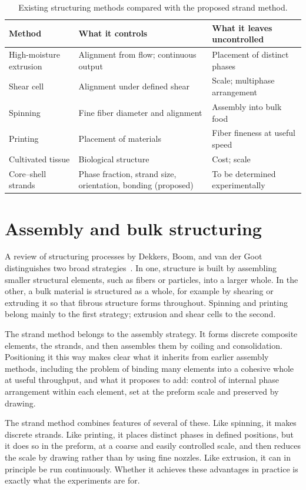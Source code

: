 \documentclass[11pt,openany]{book}
\theoremstyle{definition}
\begin{document}
\begin{table}[h]
\centering
\begin{tabularx}{\linewidth}{@{}lXX@{}}
\toprule
Method & What it controls & What it leaves uncontrolled \\
\midrule
High-moisture extrusion & Alignment from flow; continuous output & Placement of distinct phases \\
Shear cell & Alignment under defined shear & Scale; multiphase arrangement \\
Spinning & Fine fiber diameter and alignment & Assembly into bulk food \\
Printing & Placement of materials & Fiber fineness at useful speed \\
Cultivated tissue & Biological structure & Cost; scale \\
Core--shell strands & Phase fraction, strand size, orientation, bonding (proposed) & To be determined experimentally \\
\bottomrule
\end{tabularx}
\caption{Existing structuring methods compared with the proposed strand method.}
\end{table}

\section{Assembly and bulk structuring}

A review of structuring processes by Dekkers, Boom, and van der Goot distinguishes two broad strategies~\cite{dekkers2018}. In one, structure is built by assembling smaller structural elements, such as fibers or particles, into a larger whole. In the other, a bulk material is structured as a whole, for example by shearing or extruding it so that fibrous structure forms throughout. Spinning and printing belong mainly to the first strategy; extrusion and shear cells to the second.

The strand method belongs to the assembly strategy. It forms discrete composite elements, the strands, and then assembles them by coiling and consolidation. Positioning it this way makes clear what it inherits from earlier assembly methods, including the problem of binding many elements into a cohesive whole at useful throughput, and what it proposes to add: control of internal phase arrangement within each element, set at the preform scale and preserved by drawing.

The strand method combines features of several of these. Like spinning, it makes discrete strands. Like printing, it places distinct phases in defined positions, but it does so in the preform, at a coarse and easily controlled scale, and then reduces the scale by drawing rather than by using fine nozzles. Like extrusion, it can in principle be run continuously. Whether it achieves these advantages in practice is exactly what the experiments are for.
\end{document}
